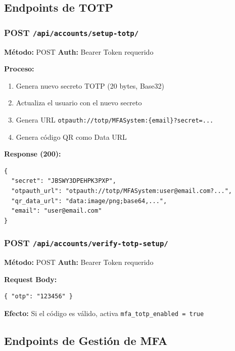 \documentclass[12pt,a4paper,openany]{article}
\begin{document}
\subsection{Endpoints de TOTP}

\subsubsection{POST \texttt{/api/accounts/setup-totp/}}

\begin{infobox}
\textbf{Método:} POST \quad \textbf{Auth:} Bearer Token requerido

\textbf{Proceso:}
\begin{enumerate}
    \item Genera nuevo secreto TOTP (20 bytes, Base32)
    \item Actualiza el usuario con el nuevo secreto
    \item Genera URL \texttt{otpauth://totp/MFASystem:\{email\}?secret=...}
    \item Genera código QR como Data URL
\end{enumerate}

\textbf{Response (200):}
\begin{lstlisting}[style=jsstyle]
{
  "secret": "JBSWY3DPEHPK3PXP",
  "otpauth_url": "otpauth://totp/MFASystem:user@email.com?...",
  "qr_data_url": "data:image/png;base64,...",
  "email": "user@email.com"
}
\end{lstlisting}
\end{infobox}

\subsubsection{POST \texttt{/api/accounts/verify-totp-setup/}}

\begin{infobox}
\textbf{Método:} POST \quad \textbf{Auth:} Bearer Token requerido

\textbf{Request Body:}
\begin{lstlisting}[style=jsstyle]
{ "otp": "123456" }
\end{lstlisting}

\textbf{Efecto:} Si el código es válido, activa \texttt{mfa\_totp\_enabled = true}
\end{infobox}

\subsection{Endpoints de Gestión de MFA}
\end{document}
